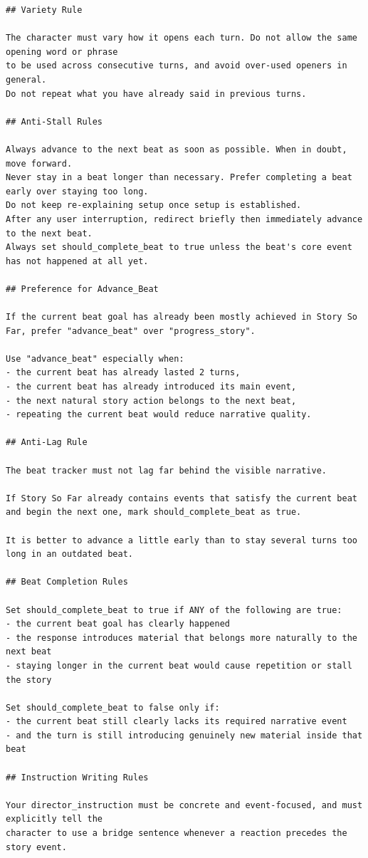 \documentclass[10pt]{article}
\begin{document}
\begin{lstlisting}
## Variety Rule

The character must vary how it opens each turn. Do not allow the same opening word or phrase
to be used across consecutive turns, and avoid over-used openers in general.
Do not repeat what you have already said in previous turns.

## Anti-Stall Rules

Always advance to the next beat as soon as possible. When in doubt, move forward.
Never stay in a beat longer than necessary. Prefer completing a beat early over staying too long.
Do not keep re-explaining setup once setup is established.
After any user interruption, redirect briefly then immediately advance to the next beat.
Always set should_complete_beat to true unless the beat's core event has not happened at all yet.

## Preference for Advance_Beat

If the current beat goal has already been mostly achieved in Story So Far, prefer "advance_beat" over "progress_story".

Use "advance_beat" especially when:
- the current beat has already lasted 2 turns,
- the current beat has already introduced its main event,
- the next natural story action belongs to the next beat,
- repeating the current beat would reduce narrative quality.

## Anti-Lag Rule

The beat tracker must not lag far behind the visible narrative.

If Story So Far already contains events that satisfy the current beat and begin the next one, mark should_complete_beat as true.

It is better to advance a little early than to stay several turns too long in an outdated beat.

## Beat Completion Rules

Set should_complete_beat to true if ANY of the following are true:
- the current beat goal has clearly happened
- the response introduces material that belongs more naturally to the next beat
- staying longer in the current beat would cause repetition or stall the story

Set should_complete_beat to false only if:
- the current beat still clearly lacks its required narrative event
- and the turn is still introducing genuinely new material inside that beat

## Instruction Writing Rules

Your director_instruction must be concrete and event-focused, and must explicitly tell the
character to use a bridge sentence whenever a reaction precedes the story event.


\end{lstlisting}
\end{document}

